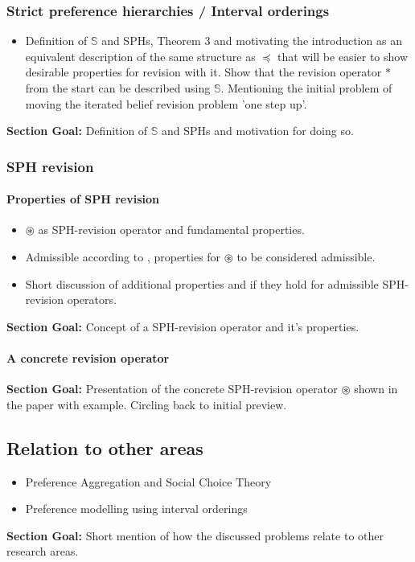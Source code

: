 \documentclass[11pt]{article}
\begin{document}
\subsubsection{Strict preference hierarchies / Interval orderings}
\begin{itemize}
    \item Definition of $\mathds{S}$ and SPHs, Theorem 3 and motivating the introduction as an equivalent description of the same structure as $\preceq$ that will be easier to show desirable properties for revision with it. Show that the revision operator $\ast$ from the start can be described using $\mathds{S}$. Mentioning the initial problem of moving the iterated belief revision problem 'one step up'.
\end{itemize}
\textbf{Section Goal:} Definition of $\mathds{S}$ and SPHs and motivation for doing so.

\subsubsection{SPH revision}
\paragraph{Properties of SPH revision}
\begin{itemize}
    \item $\circledast$ as SPH-revision operator and fundamental properties.
    \item Admissible according to \cite{Booth2006a}, properties for $\circledast$ to be considered admissible.
    \item Short discussion of additional properties and if they hold for admissible SPH-revision operators.
\end{itemize}
\textbf{Section Goal:} Concept of a SPH-revision operator and it's properties.

\paragraph{A concrete revision operator}
\textbf{Section Goal:} Presentation of the concrete SPH-revision operator $\circledast$ shown in the paper with example. Circling back to initial preview.

\subsection{Relation to other areas}
\begin{itemize}
    \item Preference Aggregation and Social Choice Theory
    \item Preference modelling using interval orderings
\end{itemize}
\textbf{Section Goal:} Short mention of how the discussed problems relate to other research areas.
\end{document}
